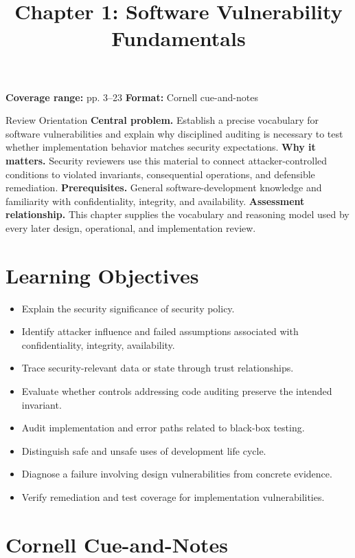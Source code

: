 \documentclass[11pt,letterpaper]{article}
\title{Chapter 1: Software Vulnerability Fundamentals}
\author{}
\date{}
\begin{document}
\maketitle

\begin{center}
\small\color{Meta}\textbf{Coverage range:} pp. 3--23 \quad\textbullet\quad \textbf{Format:} Cornell cue-and-notes
\end{center}
\vspace{0.25em}
\begin{CornellOverviewBox}{Review Orientation}
\textbf{Central problem.} Establish a precise vocabulary for software vulnerabilities and explain why disciplined auditing is necessary to test whether implementation behavior matches security expectations.
\textbf{Why it matters.} Security reviewers use this material to connect attacker-controlled conditions to violated invariants, consequential operations, and defensible remediation.
\textbf{Prerequisites.} General software-development knowledge and familiarity with confidentiality, integrity, and availability.
\textbf{Assessment relationship.} This chapter supplies the vocabulary and reasoning model used by every later design, operational, and implementation review.
\end{CornellOverviewBox}
\section{Learning Objectives}
\begin{itemize}
\item Explain the security significance of security policy.
\item Identify attacker influence and failed assumptions associated with confidentiality, integrity, availability.
\item Trace security-relevant data or state through trust relationships.
\item Evaluate whether controls addressing code auditing preserve the intended invariant.
\item Audit implementation and error paths related to black-box testing.
\item Distinguish safe and unsafe uses of development life cycle.
\item Diagnose a failure involving design vulnerabilities from concrete evidence.
\item Verify remediation and test coverage for implementation vulnerabilities.
\end{itemize}
\section{Cornell Cue-and-Notes}
\end{document}
